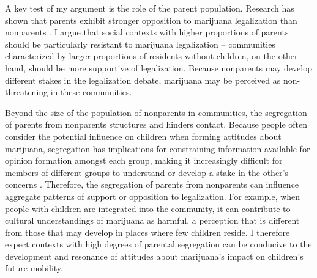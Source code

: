 A key test of my argument is the role of the parent population. Research has shown that parents exhibit stronger opposition to marijuana legalization than nonparents \citep{elder_and_greene_2019,mosher_and_akins_2019,newhart_and_dolphin_2018,caulkins_et_al_2012,rosenthal_and_kubby_1996}. I argue that social contexts with higher proportions of parents should be particularly resistant to marijuana legalization -- communities characterized by larger proportions of residents without children, on the other hand, should be more supportive of legalization. Because nonparents may develop different stakes in the legalization debate, marijuana may be perceived as non-threatening in these communities. 


Beyond the size of the population of nonparents in communities, the segregation of parents from nonparents structures and hinders contact. Because people often consider the potential influence on children when forming attitudes about marijuana, segregation has implications for constraining information available for opinion formation amongst each group, making it increasingly difficult for members of different groups to understand or develop a stake in the other's concerns \citep{herek_and_capitanio_1996}. Therefore, the segregation of parents from nonparents can influence aggregate patterns of support or opposition to legalization. %
For example, when people with children are integrated into the community, it can contribute to cultural understandings of marijuana as harmful, a perception that is different from those that may develop in places where few children reside. I therefore expect contexts with high degrees of parental segregation can be conducive to the development and resonance of attitudes about marijuana's impact on children's future mobility.

